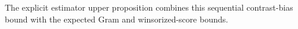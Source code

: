 The explicit estimator upper proposition combines this sequential contrast-bias bound with the expected Gram and winsorized-score bounds.